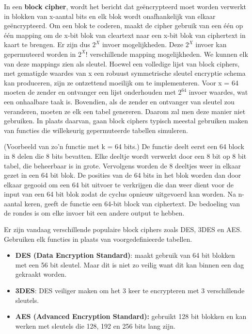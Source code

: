 In een \textbf{block cipher}, wordt het bericht dat geëncrypteerd moet worden verwerkt in blokken van x-aantal bits en elk blok wordt onafhankelijk van elkaar geëncrypteerd. Om een blok te coderen, maakt de cipher gebruik van een één op één mapping om de x-bit blok van cleartext naar een x-bit blok van ciphertext in kaart te brengen. Er zijn dus $2^X$ invoer mogelijkheden. Deze $2^X$ invoer kan gepermuteerd worden in $2^X$! verschillende mapping mogelijkheden. We kunnen elk van deze mappings zien als sleutel.
Hoewel een volledige lijst van block ciphers, met gematigde waardes van x een robuust symmetrische sleutel encryptie schema kan produceren, zijn ze ontzettend moeilijk om te implementeren. Voor x = 64 moeten de zender en ontvanger een lijst onderhouden met $2^64$ invoer waardes, wat een onhaalbare taak is. Bovendien, als de zender en ontvanger van sleutel zou veranderen, moeten ze elk een tabel genereren. Daarom zal men deze manier niet gebruiken.
In plaats daarvan, gaan block ciphers typisch meestal gebruiken maken van functies die willekeurig gepermuteerde tabellen simuleren.

(Voorbeeld van zo’n functie met k = 64 bits.) De functie deelt eerst een 64 block in 8 delen die 8 bits bevatten. Elke deeltje wordt verwerkt door een 8 bit op 8 bit tabel, die beheerbaar is in grote. Vervolgens worden de 8 deeltjes weer in elkaar gezet in een 64 bit blok. De posities van de 64 bits in het blok worden dan door elkaar gegooid om een 64 bit uitvoer te verkrijgen die dan weer dient voor de input van een 64 bit blok zodat de cyclus opnieuw uitgevoerd kan worden. Na n-aantal keren, geeft de functie een 64-bit block van ciphertext. De bedoeling van de rondes is om elke invoer bit een andere output te hebben.

Er zijn vandaag verschillende populaire block ciphers zoals DES, 3DES en AES. Gebruiken elk functies in plaats van voorgedefinieerde tabellen.
\begin{itemize}
\item \textbf{DES (Data Encryption Standard)}: maakt gebruik van 64 bit blokken met een 56 bit sleutel. Maar dit is niet zo veilig want dit kan binnen een dag gekraakt worden.
\item \textbf{3DES}: DES veiliger maken om het 3 keer te encrypteren met 3 verschillende sleutels.
\item \textbf{AES (Advanced Encryption Standard): }gebruikt 128 bit blokken en kan werken met sleutels die 128, 192 en 256 bits lang zijn.

\end{itemize}


